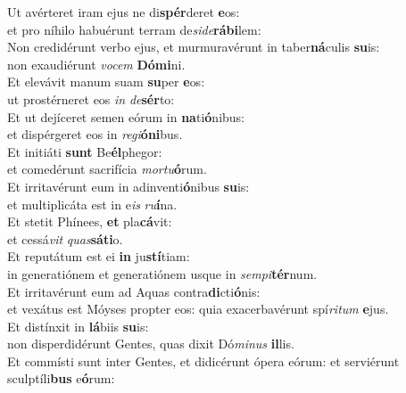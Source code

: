 \evenverse Ut avérteret iram ejus ne di\textbf{spér}deret \textbf{e}os:~\*\\
\evenverse et pro níhilo habuérunt terram de\textit{si}\textit{de}\textbf{rá}\textbf{bi}lem:\\
\oddverse Non credidérunt verbo ejus, et murmuravérunt in taber\textbf{ná}culis \textbf{su}is:~\*\\
\oddverse non exaudiérunt \textit{vo}\textit{cem} \textbf{Dó}\textbf{mi}ni.\\
\evenverse Et elevávit manum suam \textbf{su}per \textbf{e}os:~\*\\
\evenverse ut prostérneret eos \textit{in} \textit{de}\textbf{sér}to:\\
\oddverse Et ut dejíceret semen eórum in \textbf{na}ti\textbf{ó}nibus:~\*\\
\oddverse et dispérgeret eos in \textit{re}\textit{gi}\textbf{ó}\textbf{ni}bus.\\
\evenverse Et initiáti \textbf{sunt} Be\textbf{él}phegor:~\*\\
\evenverse et comedérunt sacrifícia \textit{mor}\textit{tu}\textbf{ó}rum.\\
\oddverse Et irritavérunt eum in adinventi\textbf{ó}nibus \textbf{su}is:~\*\\
\oddverse et multiplicáta est in e\textit{is} \textit{ru}\textbf{í}na.\\
\evenverse Et stetit Phínees, \textbf{et} pla\textbf{cá}vit:~\*\\
\evenverse et cessá\textit{vit} \textit{quas}\textbf{sá}\textbf{ti}o.\\
\oddverse Et reputátum est ei \textbf{in} ju\textbf{stí}tiam:~\*\\
\oddverse in generatiónem et generatiónem usque in \textit{sem}\textit{pi}\textbf{tér}num.\\
\evenverse Et irritavérunt eum ad Aquas contra\textbf{di}cti\textbf{ó}nis:~\*\\
\evenverse et vexátus est Móyses propter eos: quia exacerbavérunt spí\textit{ri}\textit{tum} \textbf{e}jus.\\
\oddverse Et distínxit in \textbf{lá}biis \textbf{su}is:~\*\\
\oddverse non disperdidérunt Gentes, quas dixit Dó\textit{mi}\textit{nus} \textbf{il}lis.\\
\evenverse Et commísti sunt inter Gentes, et didicérunt ópera eórum: et serviérunt sculptíli\textbf{bus} e\textbf{ó}rum:~\*\\

